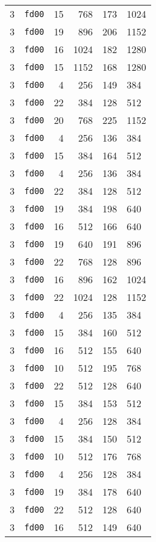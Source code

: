 \documentclass{article}
\begin{document}
\begin{table}[h!]
\begin{tabular}{llrrrl}
    3 & \texttt{fd00} & 15 & 768 & 173 & 1024 \\
    3 & \texttt{fd00} & 19 & 896 & 206 & 1152 \\
    3 & \texttt{fd00} & 16 & 1024 & 182 & 1280 \\
    3 & \texttt{fd00} & 15 & 1152 & 168 & 1280 \\
    3 & \texttt{fd00} & 4 & 256 & 149 & 384 \\
    3 & \texttt{fd00} & 22 & 384 & 128 & 512 \\
    3 & \texttt{fd00} & 20 & 768 & 225 & 1152 \\
    3 & \texttt{fd00} & 4 & 256 & 136 & 384 \\
    3 & \texttt{fd00} & 15 & 384 & 164 & 512 \\
    3 & \texttt{fd00} & 4 & 256 & 136 & 384 \\
    3 & \texttt{fd00} & 22 & 384 & 128 & 512 \\
    3 & \texttt{fd00} & 19 & 384 & 198 & 640 \\
    3 & \texttt{fd00} & 16 & 512 & 166 & 640 \\
    3 & \texttt{fd00} & 19 & 640 & 191 & 896 \\
    3 & \texttt{fd00} & 22 & 768 & 128 & 896 \\
    3 & \texttt{fd00} & 16 & 896 & 162 & 1024 \\
    3 & \texttt{fd00} & 22 & 1024 & 128 & 1152 \\
    3 & \texttt{fd00} & 4 & 256 & 135 & 384 \\
    3 & \texttt{fd00} & 15 & 384 & 160 & 512 \\
    3 & \texttt{fd00} & 16 & 512 & 155 & 640 \\
    3 & \texttt{fd00} & 10 & 512 & 195 & 768 \\
    3 & \texttt{fd00} & 22 & 512 & 128 & 640 \\
    3 & \texttt{fd00} & 15 & 384 & 153 & 512 \\
    3 & \texttt{fd00} & 4 & 256 & 128 & 384 \\
    3 & \texttt{fd00} & 15 & 384 & 150 & 512 \\
    3 & \texttt{fd00} & 10 & 512 & 176 & 768 \\
    3 & \texttt{fd00} & 4 & 256 & 128 & 384 \\
    3 & \texttt{fd00} & 19 & 384 & 178 & 640 \\
    3 & \texttt{fd00} & 22 & 512 & 128 & 640 \\
    3 & \texttt{fd00} & 16 & 512 & 149 & 640 \\

\end{tabular}
\end{table}
\end{document}
